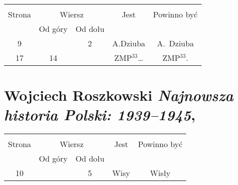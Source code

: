 \documentclass[a4paper,11pt]{article}
\numberwithin{equation}{section}
\begin{document}
\begin{center}

  \begin{tabular}{|c|c|c|c|c|}
    \hline
    & \multicolumn{2}{c|}{} & & \\
    Strona & \multicolumn{2}{c|}{Wiersz} & Jest
                              & Powinno być \\ \cline{2-3}
    & Od góry & Od dołu & & \\
    \hline
    9  & &  2 & A.Dziuba & A.~Dziuba \\
    17 & 14 & & ZMP$^{ 33 }$\ldots & ZMP$^{ 33 }$. \\
    \hline
  \end{tabular}

\end{center}

\VerSpaceTwo











\section{Wojciech Roszkowski \textit{Najnowsza historia
    Polski: 1939--1945},
  \cite{RoszkowskiNajnowszaHistoriaPolski1939-1945Wyd2011} }









\begin{center}

  \begin{tabular}{|c|c|c|c|c|}
    \hline
    & \multicolumn{2}{c|}{} & & \\
    Strona & \multicolumn{2}{c|}{Wiersz} & Jest
                              & Powinno być \\ \cline{2-3}
    & Od góry & Od dołu & & \\
    \hline
    10 & & 5 & Wisy & Wisły \\
    \hline
  \end{tabular}

\end{center}
\end{document}
